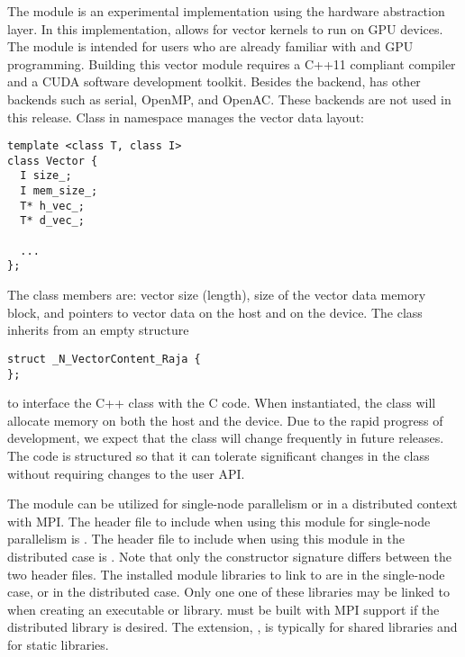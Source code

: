 %
The {\nvecraja} module is an experimental {\nvector} implementation using the
\href{https://software.llnl.gov/RAJA/}{\raja} hardware abstraction layer.
In this implementation, {\raja}
allows for {\sundials} vector kernels to run on GPU devices. The module is intended for users
who are already familiar with {\raja} and GPU programming. Building this vector
module requires a C++11 compliant compiler and a CUDA software development toolkit.
Besides the {\cuda} backend, {\raja} has other backends such as serial, OpenMP,
and OpenAC. These backends are not used in this {\sundials} release.
Class  in namespace  manages the vector data layout:
\begin{verbatim}
template <class T, class I>
class Vector {
  I size_;
  I mem_size_;
  T* h_vec_;
  T* d_vec_;

  ...
};
\end{verbatim}
The class members are: vector size (length), size of the vector data memory block,
and pointers to vector data on the host and on the device. The class 
inherits from an empty structure
\begin{verbatim}
struct _N_VectorContent_Raja {
};
\end{verbatim}
to interface the C++ class with the {\nvector} C code. When instantiated, the class
 will allocate memory on both the host and the device. Due to the rapid
progress of {\raja} development, we expect that the 
class will change frequently in future {\sundials} releases. The code is
structured so that it can tolerate significant changes in the
 class without requiring changes to the user API.


The {\nvecraja} module can be utilized for single-node parallelism or in a distributed context with MPI.
The header file to include when using this module for single-node parallelism is .
The header file to include when using this module in the distributed case is .
Note that only the {\nvecraja} constructor signature differs between the two header files.
The installed module libraries to link to are  in the single-node case,
or  in the distributed case. Only one one of these libraries may be linked to when creating an executable or library. {\sundials} must be built with
MPI support if the distributed library is desired. The extension, , is typically  for shared libraries and  for static libraries.

